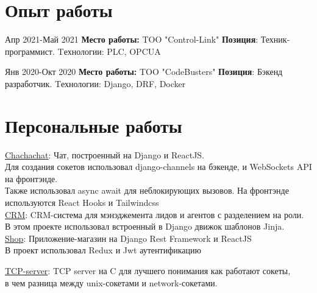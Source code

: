 \documentclass[10pt]{article} %
\begin{document}
\section{Опыт работы}

\job
{Апр 2021-}{Май 2021}
{\textbf{Место работы: }TOO "Control-Link" }
{\textbf{Позиция}: Техник-программист. Tехнологии: PLC, OPCUA}

\job
{Янв 2020-}{Окт 2020}
{\textbf{Место работы: }TOO "CodeBusters" }
{\textbf{Позиция}: Бэкенд разработчик. Tехнологии: Django, DRF, Docker}




\section{Персональные работы}


\href{https://github.com/kuator/chachachat}{Chachachat}: Чат, построенный на Django и ReactJS. \\
Для создания сокетов использовал django-channels на бэкенде, и WebSockets API на фронтэнде.\\
Также использовал async await для неблокирующих вызовов. На фронтэнде используются React Hooks и Tailwindcss\\

\href{https://github.com/kuator/customer-relations-management}{CRM}: CRM-система для мэнэджемента лидов и агентов с разделением на роли.\\
В этом проекте использовал встроенный в Django движок шаблонов Jinja. \\

\href{https://github.com/kuator/shop}{Shop}: Приложение-магазин на Django Rest Framework и ReactJS\\
В проект использовал Redux и Jwt аутентификацию

\href{https://github.com/kuator/tcp-server}{TCP-server}: TCP server на C для лучшего понимания как работают сокеты,\\
в чем разница между unix-сокетами и network-сокетами.\\
\end{document}
